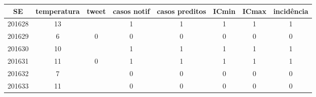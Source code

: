 \begin{tabular}{c|ccccccc}
  \hline
SE & temperatura & tweet & casos notif & casos preditos & ICmin & ICmax & incidência \\ 
  \hline
201628 & 13 &  & 1 & 1 & 1 & 1 & 1 \\ 
  201629 & 6 & 0 & 0 & 0 & 0 & 0 & 0 \\ 
  201630 & 10 &  & 1 & 1 & 1 & 1 & 1 \\ 
  201631 & 11 & 0 & 1 & 1 & 1 & 1 & 1 \\ 
  201632 & 7 &  & 0 & 0 & 0 & 0 & 0 \\ 
  201633 & 11 &  & 0 & 0 & 0 & 0 & 0 \\ 
   \hline
\end{tabular}
